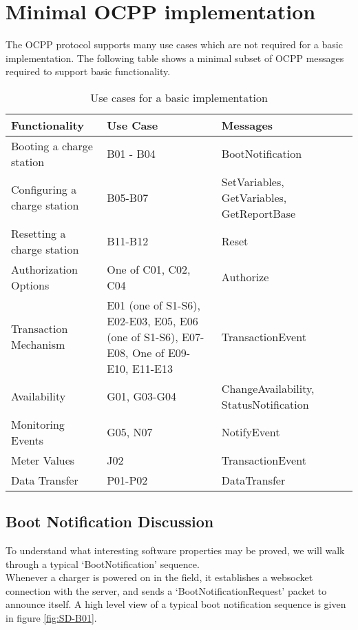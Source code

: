 \documentclass[12pt,openany,a4paper]{book}
\begin{document}
\section{Minimal OCPP implementation}
The OCPP protocol supports many use cases which are not required for a basic implementation. The following table \cite{ocpp} shows a minimal subset of OCPP messages required to support basic functionality.\\
\begin{center}
\begin{table}[htp]
\caption{Use cases for a basic implementation}
\begin{tabular}{ |p{5cm}|p{3cm}|p{4cm}|p{2cm}|}
 \hline
Functionality & 
Use Case & 
Messages
\\
 \hline
Booting a charge station& B01 - B04& BootNotification \\
 \hline
Configuring a charge station & B05-B07 & SetVariables, GetVariables, GetReportBase \\
 \hline
Resetting a charge station& B11-B12 & Reset \\
 \hline
Authorization Options& One of C01, C02, C04 & Authorize\\
 \hline
Transaction Mechanism & E01 (one of S1-S6), E02-E03,
E05, E06 (one of S1-S6), E07-
E08, One of E09-E10, E11-E13 & TransactionEvent \\
 \hline
Availability& G01, G03-G04& ChangeAvailability, StatusNotification\\
 \hline
Monitoring Events& G05, N07 & NotifyEvent\\
 \hline
Meter Values & J02 & TransactionEvent\\
 \hline
Data Transfer& P01-P02 & DataTransfer\\
 \hline
\end{tabular}
\end{table}
\end{center}

\subsection{Boot Notification Discussion}
To understand what interesting software properties may be proved, we will walk through a typical `BootNotification' sequence.\\

Whenever a charger is powered on in the field, it establishes a websocket connection with the server, and sends a `BootNotificationRequest' packet to announce itself. A high level view of a typical boot notification sequence is given in figure \ref{fig:SD-B01}.
\end{document}

